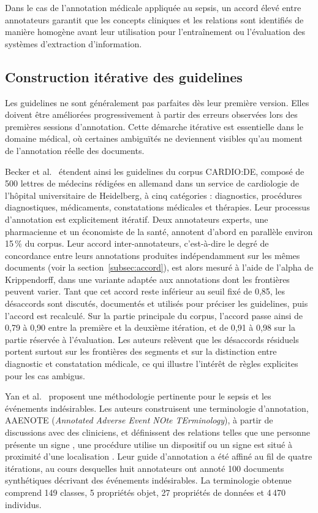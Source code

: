 Dans le cas de l'annotation médicale appliquée au sepsis, un accord élevé entre annotateurs garantit que les concepts cliniques et les relations sont identifiés de manière homogène avant leur utilisation pour l'entraînement ou l'évaluation des systèmes d'extraction d'information.

\subsection{Construction itérative des guidelines}

Les guidelines ne sont généralement pas parfaites dès leur première version. Elles doivent être améliorées progressivement à partir des erreurs observées lors des premières sessions d'annotation. Cette démarche itérative est essentielle dans le domaine médical, où certaines ambiguïtés ne deviennent visibles qu'au moment de l'annotation réelle des documents.

Becker et al.~\cite{becker2025cardio} étendent ainsi les guidelines du corpus CARDIO:DE, composé de 500 lettres de médecins rédigées en allemand dans un service de cardiologie de l'hôpital universitaire de Heidelberg, à cinq catégories : diagnostics, procédures diagnostiques, médicaments, constatations médicales et thérapies. Leur processus d'annotation est explicitement itératif. Deux annotateurs experts, une pharmacienne et un économiste de la santé, annotent d'abord en parallèle environ 15\,\% du corpus. Leur accord inter-annotateurs, c'est-à-dire le degré de concordance entre leurs annotations produites indépendamment sur les mêmes documents (voir la section~\ref{subsec:accord}), est alors mesuré à l'aide de l'alpha de Krippendorff, dans une variante adaptée aux annotations dont les frontières peuvent varier. Tant que cet accord reste inférieur au seuil fixé de 0,85, les désaccords sont discutés, documentés et utilisés pour préciser les guidelines, puis l'accord est recalculé. Sur la partie principale du corpus, l'accord passe ainsi de 0,79 à 0,90 entre la première et la deuxième itération, et de 0,91 à 0,98 sur la partie réservée à l'évaluation. Les auteurs relèvent que les désaccords résiduels portent surtout sur les frontières des segments et sur la distinction entre diagnostic et constatation médicale, ce qui illustre l'intérêt de règles explicites pour les cas ambigus.

Yan et al.~\cite{yan2023terminology} proposent une méthodologie pertinente pour le sepsis et les événements indésirables. Les auteurs construisent une terminologie d'annotation, AAENOTE (\textit{Annotated Adverse Event NOte TErminology}), à partir de discussions avec des cliniciens, et définissent des relations telles que \og une personne présente un signe \fg{}, \og une procédure utilise un dispositif \fg{} ou \og un signe est situé à proximité d'une localisation \fg{}. Leur guide d'annotation a été affiné au fil de quatre itérations, au cours desquelles huit annotateurs ont annoté 100 documents synthétiques décrivant des événements indésirables. La terminologie obtenue comprend 149 classes, 5 propriétés objet, 27 propriétés de données et 4\,470 individus.

